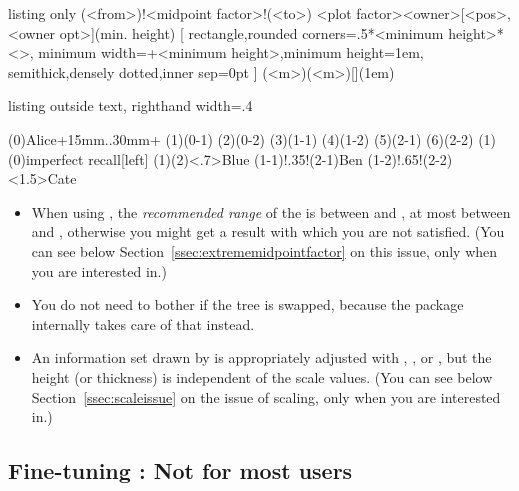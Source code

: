 \begin{tcblisting}{listing only}
  (<from>)!<midpoint factor>!(<to>)
              <plot factor>{<owner>}[<pos>,<owner opt>](min. height)
  [ rectangle,rounded corners=.5*<minimum height>*<\xtscale>,
    minimum width=+<minimum height>,minimum height=1em,
    semithick,densely dotted,inner sep=0pt ]
  (<m>)(<m>){}[](1em)
\end{tcblisting}


\begin{tcblisting}{listing outside text, righthand width=.4\linewidth}
\begin{istgame}[font=\scriptsize]
\istroot(0){Alice}+15mm..30mm+
                  \istb \istb \endist
\istroot(1)(0-1)  \istb \istb \endist
\istroot(2)(0-2)  \istb \istb \endist
\xtdistance{10mm}{10mm}
\istroot(3)(1-1)  \istb \istb \endist
\istroot(4)(1-2)  \istb \istb \endist
\istroot(5)(2-1)  \istb \istb \endist
\istroot(6)(2-2)  \istb \istb \endist
\xtCInfosetO[fill=blue!20]
   (1)(0){imperfect recall}[left]
(1)(2)<.7>{Blue}
\xtCInfosetO(1-1)!.35!(2-1){Ben}
\xtCInfosetO[fill=red!40,opacity=.5]
   (1-2)!.65!(2-2)<1.5>{Cate}
\end{istgame}
\end{tcblisting}


\remark

\begin{itemize}
\item When using \cmd{\xtCInfosetO}, the \emph{recommended range} of the  is between  and , at most between  and , otherwise you might get a result with which you are not satisfied. (You can see below Section~\ref{ssec:extrememidpointfactor} on this issue, only when you are interested in.)
\item You do not need to bother if the tree is swapped, because the package internally takes care of that instead.
\item An information set drawn by \cmd{\xtCInfosetO} is appropriately adjusted with , , or , but the height (or thickness) is independent of the scale values. (You can see below Section~\ref{ssec:scaleissue} on the issue of scaling, only when you are interested in.)
\end{itemize}


\subsection{Fine-tuning \protect\cmd{\xtCInfosetO}: Not for most users}

